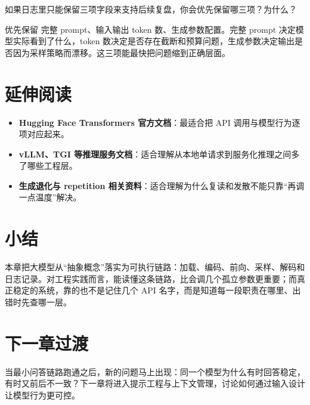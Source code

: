 \begin{exercise}[复盘最小日志]
如果日志里只能保留三项字段来支持后续复盘，你会优先保留哪三项？为什么？
\end{exercise}

\begin{solution}
优先保留 {\heiti 完整 prompt、输入输出 token 数、生成参数配置}。完整 prompt 决定模型实际看到了什么，token 数决定是否存在截断和预算问题，生成参数决定输出是否因为采样策略而漂移。这三项能最快把问题缩到正确层面。
\end{solution}

\section{延伸阅读}
\begin{itemize}
  \item \textbf{Hugging Face Transformers 官方文档}：最适合把 API 调用与模型行为逐项对应起来。
  \item \textbf{vLLM、TGI 等推理服务文档}：适合理解从本地单请求到服务化推理之间多了哪些工程层。
  \item \textbf{生成退化与 repetition 相关资料}：适合理解为什么复读和发散不能只靠“再调一点温度”解决。
\end{itemize}

\section{小结}
本章把大模型从“抽象概念”落实为可执行链路：加载、编码、前向、采样、解码和日志记录。对工程实践而言，能读懂这条链路，比会调几个孤立参数更重要；而真正稳定的系统，靠的也不是记住几个 API 名字，而是知道每一段职责在哪里、出错时先查哪一层。

\section{下一章过渡}
当最小问答链路跑通之后，新的问题马上出现：同一个模型为什么有时回答稳定，有时又前后不一致？下一章将进入提示工程与上下文管理，讨论如何通过输入设计让模型行为更可控。
